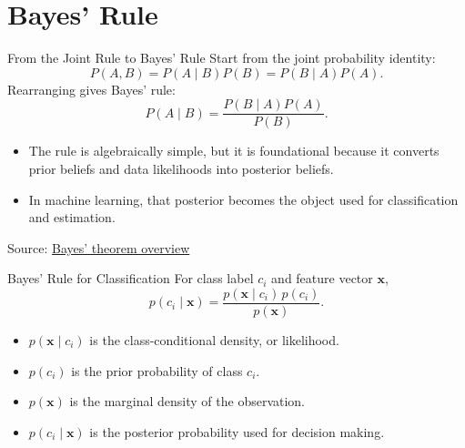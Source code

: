 \documentclass[10pt]{beamer}
\begin{document}
\section{Bayes' Rule}

\begin{frame}{From the Joint Rule to Bayes' Rule}
  \justifying
  Start from the joint probability identity:
  \[
    P(A,B) = P(A\mid B)P(B) = P(B\mid A)P(A).
  \]
  Rearranging gives Bayes' rule:
  \[
    P(A\mid B) = \frac{P(B\mid A)P(A)}{P(B)}.
  \]
  \begin{itemize}
    \item The rule is algebraically simple, but it is foundational because it converts prior beliefs and data likelihoods into posterior beliefs.
    \item In machine learning, that posterior becomes the object used for classification and estimation.
  \end{itemize}
  \vspace{0.3em}
  {\footnotesize Source: \href{https://en.wikipedia.org/wiki/Bayes\%27_theorem}{Bayes' theorem overview}}
\end{frame}

\begin{frame}{Bayes' Rule for Classification}
  \justifying
  For class label $c_i$ and feature vector $\bm{x}$,
  \[
    p(c_i\mid\bm{x}) = \frac{p(\bm{x}\mid c_i)\,p(c_i)}{p(\bm{x})}.
  \]
  \begin{itemize}
    \item $p(\bm{x}\mid c_i)$ is the class-conditional density, or likelihood.
    \item $p(c_i)$ is the prior probability of class $c_i$.
    \item $p(\bm{x})$ is the marginal density of the observation.
    \item $p(c_i\mid\bm{x})$ is the posterior probability used for decision making.
  \end{itemize}
\end{frame}
\end{document}
